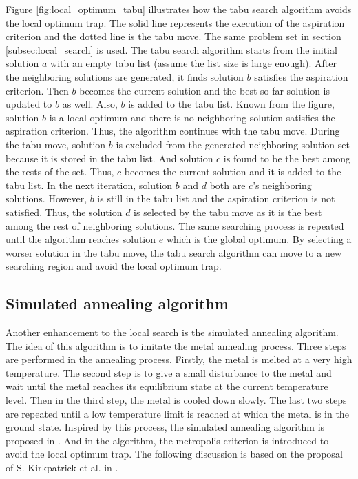 		Figure \ref{fig:local_optimum_tabu} illustrates how the tabu search algorithm avoids
		the local optimum trap. The solid line represents the execution of the aspiration
		criterion and the dotted line is the tabu move. The same problem set in section
		\ref{subsec:local_search} is used.
		The tabu search algorithm starts from the initial solution $a$ with an empty tabu
		list (assume the list size is large enough).
		After the neighboring solutions are generated, it finds solution $b$ satisfies the
		aspiration criterion. Then $b$ becomes the current solution and the best-so-far
		solution is updated to $b$ as well. Also, $b$ is added to the tabu list.
		Known from the figure, solution $b$ is a local optimum and there is no neighboring
		solution satisfies the aspiration criterion. Thus, the algorithm continues with the tabu move.
		During the tabu move, solution $b$ is excluded from the generated neighboring
		solution set because it is stored in the tabu list. And solution $c$ is found to be
		the best among the rests of the set. Thus, $c$ becomes the current solution and
		it is added to the tabu list.
		In the next iteration, solution $b$ and $d$ both are $c$'s neighboring solutions.
		However, $b$ is still in the tabu list and the aspiration criterion is not satisfied.
		Thus, the solution $d$ is selected by the tabu move as it is the best among the rest
		of neighboring solutions. The same searching process is repeated until the algorithm
		reaches solution $e$ which is the global optimum. By selecting a worser solution in
		the tabu move, the tabu search algorithm can move to a new searching region and avoid
		the local optimum trap.
	
		\subsection{Simulated annealing algorithm}
		\label{subsec:simulated_annealing}
		Another enhancement to the local search is the simulated annealing algorithm.
		The idea of this algorithm is to imitate the metal annealing process. Three steps
		are performed in the annealing process. Firstly, the metal is melted at a very high
		temperature. The second step is to give a small disturbance to the metal and wait
		until the metal reaches its equilibrium state at the current temperature level.
		Then in the third step, the metal is cooled down slowly.
		The last two steps are repeated until a low temperature limit is reached at which 
		the metal is in the ground state.
		Inspired by this process, the simulated annealing algorithm is proposed in
		\cite{10.2307/1690046}. And in the algorithm, the metropolis criterion is introduced
		to avoid the local optimum trap. The following discussion is based on the proposal
		of S. Kirkpatrick et al. in \cite{10.2307/1690046}.
		
